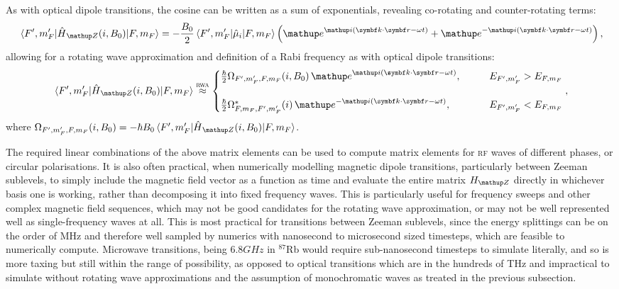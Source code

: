 As with optical dipole transitions, the cosine can be written as a sum of exponentials, revealing co-rotating and counter-rotating terms:
\begin{align}
\matrixel{F^\prime, m_F^\prime}{\hat H_\up{Z}(i, B_0)}{F, m_F}
=
-\frac{B_0}2\matrixel{F^\prime, m_F^\prime}{\hat{\mu}_i}{F, m_F}
\left(\ee^{\ii(\vec k\cdot \vec r - \omega t)}
+ \ee^{-\ii(\vec k\cdot \vec r - \omega t)}\right),
\end{align}
allowing for a rotating wave approximation and definition of a Rabi frequency as with optical dipole transitions:
\begin{align}\label{eq:magnetic_rwa_with_rabifreq}
\matrixel{F^\prime, m_F^\prime}{\hat H_\up{Z}(i, B_0)}{F, m_F} \overset{\textsc{rwa}}\approx
\begin{cases}
\frac\hbar2\Omega_{F^\prime, m_F^\prime, F, m_F}(i, B_0)\,
\ee^{\ii(\vec k \cdot \vec r - \omega t)},\qquad
& E_{F^\prime, m_F^\prime} > E_{F, m_F}\\
\\
\frac\hbar2\Omega^*_{F, m_F, F^\prime, m_F^\prime}(i)\,
\ee^{-\ii(\vec k \cdot \vec r - \omega t)},\qquad
& E_{F^\prime, m_F^\prime} < E_{F, m_F}
\end{cases},
\end{align}
where $\Omega_{F^\prime, m_F^\prime, F, m_F}(i, B_0) = -\hbar B_0 \matrixel{F^\prime, m_F^\prime}{\hat H_\up{Z}(i, B_0)}{F, m_F}$.

The required linear combinations of the above matrix elements can be used to compute matrix elements for \textsc{rf} waves of different phases, or circular polarisations. It is also often practical, when numerically modelling magnetic dipole transitions, particularly between Zeeman sublevels, to simply include the magnetic field vector as a function as time and evaluate the entire matrix $H_\up{Z}$ directly in whichever basis one is working, rather than decomposing it into fixed frequency waves. This is particularly useful for frequency sweeps and other complex magnetic field sequences, which may not be good candidates for the rotating wave approximation, or may not be well represented well as single-frequency waves at all. This is most practical for transitions between Zeeman sublevels, since the energy splittings can be on the order of MHz and therefore well sampled by numerics with nanosecond to microsecond sized timesteps, which are feasible to numerically compute. Microwave transitions, being $6.8 GHz$ in $^{87}$Rb would require sub-nanosecond timesteps to simulate literally, and so is more taxing but still within the range of possibility, as opposed to optical transitions which are in the hundreds of THz and impractical to simulate without rotating wave approximations and the assumption of monochromatic waves as treated in the previous subsection.

